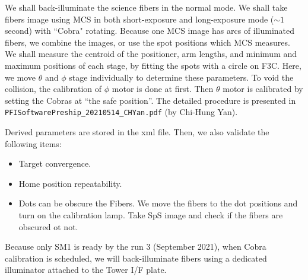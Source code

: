 \smallskip

We shall back-illuminate the science fibers in the normal mode.
We shall take fibers image using MCS in both short-exposure and long-exposure mode ($\sim 1$ second) with ``Cobra" rotating.
Because one MCS image has arcs of illuminated fibers, we combine the images, or use the spot positions which MCS measures.
We shall measure the centroid of the positioner, arm lengths, and minimum and maximum positions of each stage, by fitting the spots with a circle on F3C.
Here, we move $\theta$ and $\phi$ stage individually to determine these parameters.
To void the collision, the calibration of $\phi$ motor is done at first.
Then $\theta$ motor is calibrated by setting the Cobras at ``the safe position''.
The detailed procedure is presented in {\tt PFISoftwarePreship\_20210514\_CHYan.pdf} (by Chi-Hung Yan).


Derived parameters are stored in the xml file.
Then, we also validate the following items:
\begin{itemize}
\item Target convergence.
\item Home position repeatability.
\item Dots can be obscure the Fibers.
We move the fibers to the dot positions and turn on the calibration lamp.
Take SpS image and check if the fibers are obscured ot not.
\end{itemize}

Because only SM1 is ready by the run 3 (September 2021), when Cobra calibration is scheduled, we will back-illuminate fibers using a dedicated illuminator attached to the Tower I/F plate.

